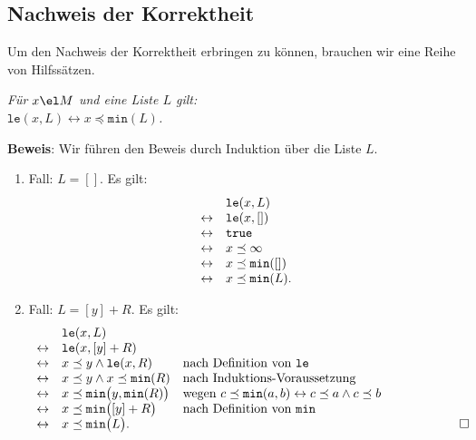\subsection{Nachweis der Korrektheit}
Um den Nachweis der Korrektheit erbringen zu k\"onnen, brauchen wir eine Reihe von
Hilfss\"atzen.

\begin{Lemma} \label{l2} 
{\em 
F\"ur  $x\el M$ und eine Liste $L$ gilt: \\[0.1cm]
\hspace*{1.3cm} $\mathtt{le}(x, L) \leftrightarrow x \preceq \texttt{min}(L)$.
}
\end{Lemma}
\textbf{Beweis}:  Wir f\"uhren den Beweis durch Induktion \"uber die Liste $L$.
\begin{enumerate}
\item Fall: $L = []$. Es gilt:
      \[
      \begin{array}[b]{cl}
                       & \mathtt{le}(x, L) \\
       \leftrightarrow & \mathtt{le}(x, []) \\
       \leftrightarrow & \mathtt{true} \\
       \leftrightarrow & x \preceq \infty \\
       \leftrightarrow & x \preceq \mathtt{min}([]) \\
       \leftrightarrow & x \preceq \mathtt{min}(L).
      \end{array}     
      \]
\item Fall: $L = [y] + R$.  Es gilt:
      \[
      \begin{array}[b]{cll}
                       & \mathtt{le}(x, L)  & \\
       \leftrightarrow & \mathtt{le}(x, [y] + R)  & \\
       \leftrightarrow & x \preceq y \wedge \mathtt{le}(x, R)  & \mbox{nach Definition von \texttt{le}} \\
       \leftrightarrow & x \preceq y \wedge x \preceq \mathtt{min}(R)  & \mbox{nach Induktions-Voraussetzung} \\
       \leftrightarrow & x \preceq \mathtt{min}\bigl(y, \mathtt{min}(R) \bigr) &
          \mbox{wegen $c \preceq \mathtt{min}(a,b) \leftrightarrow c \preceq a \wedge c \preceq b$} \\
       \leftrightarrow & x \preceq \mathtt{min}\bigl( [y] + R \bigr) &
          \mbox{nach Definition von \texttt{min}} \\
       \leftrightarrow & x \preceq \mathtt{min}\bigl(L \bigr). &
      \end{array} \hspace*{2cm} \Box
      \]
\end{enumerate}

